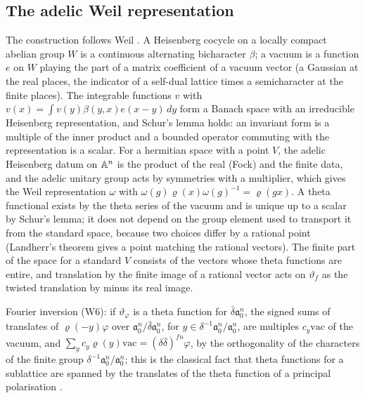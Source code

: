 \subsection{The adelic Weil representation}\label{ss:B-weil}
The construction follows Weil \cite{Weil1964}. A Heisenberg cocycle on a locally compact abelian group
$W$ is a continuous alternating bicharacter $\beta$; a vacuum is a function $e$ on $W$ playing the part of a
matrix coefficient of a vacuum vector (a Gaussian at the real places, the indicator of a self-dual
lattice times a semicharacter at the finite places). The integrable functions $v$ with
$v(x)=\int v(y)\beta(y,x)e(x-y)\,dy$ form a Banach space with an irreducible Heisenberg representation, and
Schur's lemma holds: an invariant form is a multiple of the inner product and a bounded operator commuting
with the representation is a scalar. For a hermitian space with a point $V$, the adelic Heisenberg
datum on $\mathbb{A}^n$ is the product of the real (Fock) and the finite data, and the adelic unitary group
acts by symmetries with a multiplier, which gives the Weil representation $\omega$ with
$\omega(g)\varrho(x)\omega(g)^{-1}=\varrho(gx)$. A theta functional exists by the theta series of the vacuum and
is unique up to a scalar by Schur's lemma; it does not depend on the group element used to transport it
from the standard space, because two choices differ by a rational point (Landherr's theorem gives a
point matching the rational vectors). The finite part of the space for a standard $V$ consists of the
vectors whose theta functions are entire, and translation by the finite image of a rational vector acts
on $\vartheta_f$ as the twisted translation by minus its real image.

Fourier inversion (W6): if $\vartheta_\varphi$ is a theta function for $\bar\delta\mathfrak a_0^n$, the signed sums
of translates of $\varrho(-y)\varphi$ over $\mathfrak a_0^n/\bar\delta\mathfrak a_0^n$, for $y\in\delta^{-1}\mathfrak
a_0^n/\mathfrak a_0^n$, are multiples $c_y\mathrm{vac}$ of the vacuum, and $\sum_yc_y\varrho(y)\mathrm{vac}=
(\delta\bar\delta)^{fn}\varphi$, by the orthogonality of the characters of the finite group
$\delta^{-1}\mathfrak a_0^n/\mathfrak a_0^n$; this is the classical fact that theta functions for a sublattice
are spanned by the translates of the theta function of a principal polarisation
\cite[II]{Mumford1983}.

